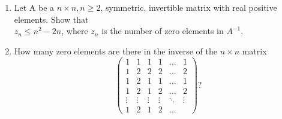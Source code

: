 \documentclass{article}
\begin{document}
	\setlength{\parindent}{0pt}
	\begin{enumerate}[label=\alph*)]
		\item  Let A be a $n\times n, n \geq 2$, symmetric, invertible matrix with real
		positive elements. Show that\\
		$z_n \leq n^2-2n$, where $z_n$ is the number of zero
		elements in $A^{-1}$.\par
		\item How many zero elements are there in the inverse of the $n\times n$ matrix
		$$\begin{pmatrix}
			1&1&1&1&\dots&1\\
			1&2&2&2&\dots&2\\
			1&2&1&1&\dots&1\\
			1&2&1&2&\dots&2\\
			\vdots&\vdots&\vdots&\vdots&\ddots&\vdots\\
			1&2&1&2&\dots&
		\end{pmatrix}?$$
	\end{enumerate}
\end{document}
